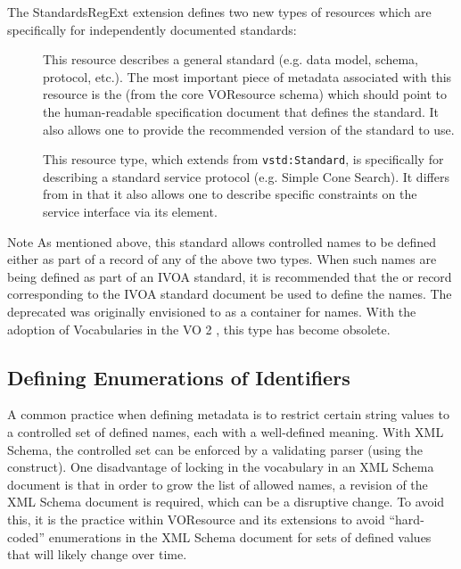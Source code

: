 \documentclass[11pt,a4paper]{ivoa}
\begin{document}
The StandardsRegExt extension defines two new types of resources which
are specifically for independently documented standards:

\begin{description}
\item[] This resource describes a general standard (e.g. data model,
       schema, protocol, etc.).  The most important piece of metadata
       associated with this resource is the
       (from the core VOResource schema)
       which should point to the human-readable specification document
       that defines the standard.  It also allows one to provide the
       recommended version of the standard to use.
\item[] This resource type, which extends from
       \texttt{vstd:Standard}, is specifically for describing a
       standard service protocol (e.g. Simple Cone Search).  It
       differs from  in that it also allows
       one to describe specific constraints on the service interface
       via its
       element.


\end{description}

\begin{admonition}{Note}
       As mentioned above, this standard allows controlled names to be
       defined either as part of a record of any of the above two
       types.  When such names are being defined as part of an IVOA
       standard, it is recommended that the  or
        record corresponding to the
       IVOA standard document be used to define the names.  The deprecated
        was originally envisioned to
       as a container for names.  With the adoption of Vocabularies in
       the VO 2 \citep{2021ivoa.spec.0525D}, this type has 
       become obsolete.
\end{admonition}


\subsection{Defining Enumerations of Identifiers }
\label{sect:keys}

A common practice when defining metadata is to restrict
certain string values to a controlled set of defined names, each with
a well-defined meaning.  With XML
Schema, the controlled set can be enforced by a validating parser
(using the  construct).
One disadvantage of locking in the
vocabulary in an XML Schema document is that in order to grow the list
of allowed names, a revision of the XML Schema document is required,
which can be a disruptive change.  To avoid this, it is the practice
within VOResource and its extensions to avoid ``hard-coded''
enumerations in the XML Schema document for sets of defined values
that will likely change over time.
\end{document}
